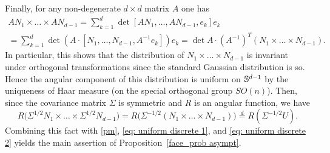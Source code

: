 \documentclass[12pt, reqno]{amsart}
\begin{document}
Finally, for any non-degenerate $d \times d$ matrix $A$ one has
\begin{multline*}
A N_1 \times \ldots \times A N_{d-1} = \sum_{k=1}^d \det[A N_1, \dots, A N_{d-1}, e_k] e_k \\
= \sum_{k=1}^d \det(A \cdot [N_1, \dots, N_{d-1}, A^{-1} e_k]) e_k 
= \det A \cdot (A^{-1})^T (N_1 \times \ldots \times N_{d-1}).
\end{multline*}
In particular, this shows that the distribution of $N_1 \times \ldots \times N_{d-1}$ is invariant under orthogonal transformations since the standard Gaussian distribution is so. Hence the angular component of this distribution is uniform on $\S^{d-1}$ by the uniqueness of Haar measure (on the special orthogonal group $SO(n)$). Then, since the covariance matrix $\Sigma$ is symmetric and $R$ is an angular function, we have
$$R \bigl(\Sigma^{1/2} N_1 \times \ldots \times \Sigma^{1/2} N_{d-1} \bigr) = R \bigl(\Sigma^{-1/2}  (N_1 \times \ldots \times  N_{d-1}) \bigr) \stackrel{d}{=} R(\Sigma^{-1/2} U).$$ Combining this fact with \eqref{pm}, \eqref{eq: uniform discrete 1}, and \eqref{eq: uniform discrete 2} yields the main assertion of Proposition~\ref{face_prob asympt}.


\end{document}

